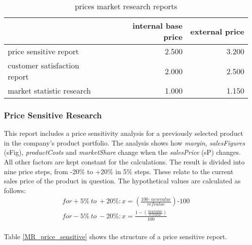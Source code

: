 \begin{table}[ht]
\centering
\begin{tabular}{|l|r|r|}
\hline
 & \textbf{internal base price}  & \textbf{external price} \\ \hline
price sensitive report       & 2.500                & 3.200     \\
customer satisfaction report & 2.000                & 2.500     \\
market statistic research    & 1.000                & 1.150     \\
\hline
\end{tabular}
\caption{prices market research reports}
\label{MR_report_price}
\end{table}

\subsubsection{Price Sensitive Research}
This report includes a price sensitivity analysis for a previously selected product in the company's product portfolio. The analysis shows how \textit{margin}, \textit{salesFigures} (\gls{sFig}), \textit{productCosts} and \textit{marketShare} change when the \textit{salesPrice} (\gls{sP}) changes. All other factors are kept constant for the calculations. The result is divided into nine price steps, from -20\% to +20\% in 5\% steps. These relate to the current sales price of the product in question. The hypothetical values are calculated as follows:
\begin{equation}
    \begin{aligned}
       for +5\% ~to~ +20\%: x = (\frac{100 \cdot new value}{ref value}) \text{-} 100\\
       for -5\% ~to ~-20\%: x = \frac{1-(\frac{new value}{ref value})}{100}\\
    \end{aligned}
\end{equation}

Table \ref{MR_price_sensitive} shows the structure of a price sensitive report. 

